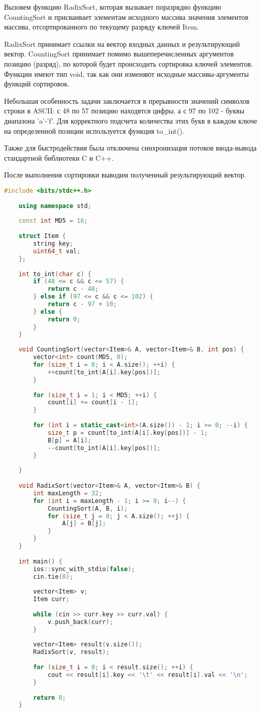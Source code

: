 Вызовем функцию RadixSort, которая вызывает поразрядно функцию CountingSort и присваивает элементам исходного массива значения элементов массива, отсортированного по текущему разряду ключей Item.

RadixSort принимает ссылки на вектор входных данных и результирующий вектор. CountingSort принимает помимо вышеперечисленных аргументов позицию (разряд), по которой будет происходить сортировка ключей элементов.
Функции имеют тип void, так как они изменяют исходные массивы-аргументы функций сортировок.

Небольшая особенность задачи заключается в прерывности значений символов строки в ASCII: с 48 по 57 позицию находятся цифры, а с 97 по 102 - буквы диапазона 'a'-'f'. Для корректного подсчета количества этих букв в каждом ключе на определенной позиции используется функция to\_int().

Также для быстродействия была отключена синхронизация потоков ввода-вывода стандартной библиотеки C и C++.

После выполнения сортировки выводим полученный результирующий вектор. 

\begin{lstlisting}[language=C++]
	#include <bits/stdc++.h>
	
	using namespace std;
	
	const int MD5 = 16;
	
	struct Item {
		string key;
		uint64_t val;
	};
	
	int to_int(char c) {
		if (48 <= c && c <= 57) {
			return c - 48;
		} else if (97 <= c && c <= 102) {
			return c - 97 + 10;
		} else {
			return 0;
		}
	}
	
	void CountingSort(vector<Item>& A, vector<Item>& B, int pos) {
		vector<int> count(MD5, 0);
		for (size_t i = 0; i < A.size(); ++i) {
			++count[to_int(A[i].key[pos])];
		}
		
		for (size_t i = 1; i < MD5; ++i) {
			count[i] += count[i - 1];
		}
		
		for (int i = static_cast<int>(A.size()) - 1; i >= 0; --i) {
			size_t p = count[to_int(A[i].key[pos])] - 1;
			B[p] = A[i];
			--count[to_int(A[i].key[pos])];
		}
		
	}
	
	void RadixSort(vector<Item>& A, vector<Item>& B) {
		int maxLength = 32;
		for (int i = maxLength - 1; i >= 0; i--) {
			CountingSort(A, B, i);
			for (size_t j = 0; j < A.size(); ++j) {
				A[j] = B[j];
			}
		}
	}
	
	int main() {
		ios::sync_with_stdio(false);
		cin.tie(0);
		
		vector<Item> v;
		Item curr;
		
		while (cin >> curr.key >> curr.val) {
			v.push_back(curr);
		}
		
		vector<Item> result(v.size());
		RadixSort(v, result);
		
		for (size_t i = 0; i < result.size(); ++i) {
			cout << result[i].key << '\t' << result[i].val << '\n';
		}
		
		return 0;
	}
	
	
\end{lstlisting}


